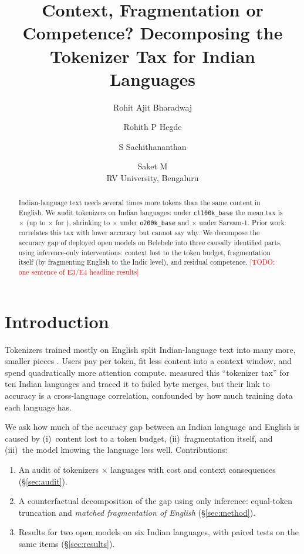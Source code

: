 \documentclass[11pt]{article}
\title{Context, Fragmentation or Competence? Decomposing the Tokenizer Tax for Indian Languages}
\author{Rohit Ajit Bharadwaj \and Rohith P Hegde \and S Sachithananthan \and Saket M \\
  RV University, Bengaluru}
\newcommand{\todo}[1]{\textcolor{red}{[TODO: #1]}}
\begin{document}
\maketitle

\begin{abstract}
Indian-language text needs several times more tokens than the same content in English. We audit
\nTokenizers{} tokenizers on \nLangs{} Indian languages: under \texttt{cl100k\_base} the mean tax is
\meanTaxCl$\times$ (up to \maxTaxCl$\times$ for \maxTaxLangCl), shrinking to \meanTaxOo$\times$ under
\texttt{o200k\_base} and \meanTaxSa$\times$ under Sarvam-1. Prior work correlates this tax with lower
accuracy but cannot say why. We decompose the accuracy gap of deployed open models on Belebele into
three causally identified parts, using inference-only interventions: context lost to the token budget,
fragmentation itself (by fragmenting English to the Indic level), and residual competence.
\todo{one sentence of E3/E4 headline results}
\end{abstract}

\section{Introduction}
Tokenizers trained mostly on English split Indian-language text into many more, smaller pieces
\citep{petrov2023,ahia2023}. Users pay per token, fit less content into a context window, and spend
quadratically more attention compute. \citet{srivastava2026} measured this ``tokenizer tax'' for ten Indian
languages and traced it to failed byte merges, but their link to accuracy is a cross-language
correlation, confounded by how much training data each language has.

We ask how much of the accuracy gap between an Indian language and English is caused by (i)~content lost
to a token budget, (ii)~fragmentation itself, and (iii)~the model knowing the language less well.
Contributions:
\begin{enumerate}
  \item An audit of \nTokenizers{} tokenizers $\times$ \nLangs{} languages with cost and context consequences (\S\ref{sec:audit}).
  \item A counterfactual decomposition of the gap using only inference: equal-token truncation and
        \emph{matched fragmentation of English} (\S\ref{sec:method}).
  \item Results for two open models on six Indian languages, with paired tests on the same items (\S\ref{sec:results}).
\end{enumerate}
\end{document}
